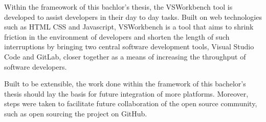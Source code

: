     

Within the frameowork of this bachlor's thesis, the VSWorkbench tool is developed to assist developers in their day to day tasks.
Built on web technologies such as HTML CSS and Javascript, VSWorkbench is a tool that aims to shrink friction in the environment of developers 
and shorten the length of such interruptions by bringing two central software development tools, 
Visual Studio Code and GitLab, closer together as a means of increasing the throughput of software developers. 

Built to be extensible, the work done within the framework of this bachelor's thesis should lay the basis for future integration of more platforms.
Moreover, steps were taken to facilitate future collaboration of the open source community, such as open sourcing the project on GitHub.
\endgroup

